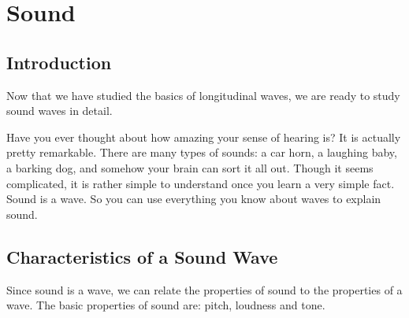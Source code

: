\chapter{Sound}
\label{p:wsl:s11}


\section{Introduction}
Now that we have studied the basics of longitudinal waves, we are ready to study sound waves in detail.

Have you ever thought about how amazing your sense of hearing is? It is actually pretty remarkable. There are many types of sounds: a car horn, a laughing baby, a barking dog, and somehow your brain can sort it all out. Though it seems complicated, it is rather simple to understand once you learn a very simple fact. Sound is a wave. So you can use everything you know about waves to explain sound.

\section{Characteristics of a Sound Wave}

Since sound is a wave, we can relate the properties of sound to the properties of a wave. The basic properties of sound are: pitch, loudness and tone.

